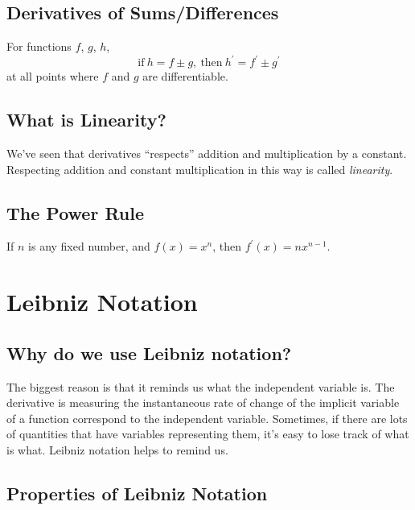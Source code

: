 \subsection{Derivatives of Sums/Differences}
For functions $f$, $g$, $h$,
\[\text{if}\ h=f\pm g,\ \text{then}\ h^\prime=f^\prime\pm g^\prime\]
at all points where $f$ and $g$ are differentiable.

\subsection{What is Linearity?}
We've seen that derivatives ``respects'' addition and multiplication by a constant. Respecting addition and constant multiplication in this way is called \textit{linearity}.

\subsection{The Power Rule}
If $n$ is any fixed number, and $f(x)=x^n$, then $f^\prime(x)=nx^{n-1}$.

\section{Leibniz Notation}
\subsection{Why do we use Leibniz notation?}
The biggest reason is that it reminds us what the independent variable is. The derivative is measuring the instantaneous rate of change of the implicit variable of a function correspond to the independent variable. Sometimes, if there are lots of quantities that have variables representing them, it's easy to lose track of what is what. Leibniz notation helps to remind us.

\subsection{Properties of Leibniz Notation}

